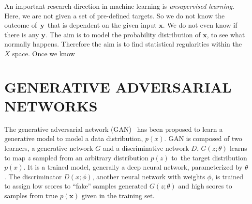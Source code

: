 \documentclass[a4paper,onesided,12pt]{report}
\begin{document}
An important research direction in machine learning is \emph{unsupervised learning}. Here, we are not given a set of pre-defined targets. So we do not know the outcome of~$\boldsymbol{y}$~that is dependent on the given input $\boldsymbol{x}$. We do not even know if there is any $\boldsymbol{y}$. The aim is to model the probability distribution of $\boldsymbol{x}$, to see what normally happens. Therefore the aim is to find statistical regularities within the $X$ space. Once we know 





\chapter{GENERATIVE ADVERSARIAL NETWORKS}
\label{chapter:generative-adversarial-networks}

The generative adversarial network (GAN) \cite{gan}~has been proposed to learn a generative model to model a data distribution, $p(x)$. GAN is composed of two learners, a generative network $G$ and a discriminative network $D$. $G(z;\theta)$ learns to map $z$ sampled from an arbitrary distribution $p(z)$ to~the target distribution $p(x)$. It is a trained model, generally a deep neural network, parameterized by $\theta$. The discriminator $D(x;\phi)$, another neural network with weights $\phi$, is trained to assign low scores to ``fake'' samples generated $G(z;\theta)$ and high scores to samples from true $p(\boldsymbol{x})$ given in the training set.
\end{document}
